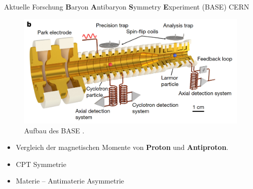 \documentclass[t,9pt]{beamer}
\begin{document}
        \begin{frame}{Aktuelle Forschung}
                \textbf{B}aryon \textbf{A}ntibaryon \textbf{S}ymmetry \textbf{E}xperiment (BASE) CERN
                \begin{figure}
                        \centering
                        \includegraphics[width=.6\textwidth]{prosi_base_aufbau.png}
                        \caption{Aufbau des BASE \cite{Smorra2017}.}
                \end{figure}
                \begin{minipage}{.5\textwidth}
                \begin{itemize}
                        \item Vergleich der magnetischen Momente von \textbf{Proton} und \textbf{Antiproton}.
                        \item CPT Symmetrie
                        \item Materie -- Antimaterie Asymmetrie
                \end{itemize}
                \end{minipage}
                \begin{minipage}{.4\textwidth}
                \begin{center}
                \end{center}
                \vspace{-.2cm}\hspace{6.5cm}\tiny\cite{Smorra2017}\normalsize
                \end{minipage}
        \end{frame}
\end{document}
